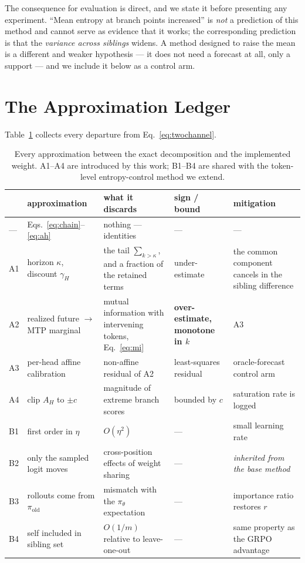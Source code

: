 \documentclass[11pt]{article}
\newcommand{\AH}{A_{H}}
\newcommand{\pit}{\pi_{\theta}}
\begin{document}
The consequence for evaluation is direct, and we state it before presenting any
experiment. ``Mean entropy at branch points increased'' is \emph{not} a prediction of
this method and cannot serve as evidence that it works; the corresponding prediction
is that the \emph{variance across siblings} widens. A method designed to raise the
mean is a different and weaker hypothesis --- it does not need a forecast at all,
only a support --- and we include it below as a control arm.

\section{The Approximation Ledger}
\label{sec:ledger}

Table~\ref{tab:ledger} collects every departure from Eq.~\eqref{eq:twochannel}.

\begin{table}[t]
\centering
\footnotesize
\setlength{\tabcolsep}{4pt}
\begin{tabular}{@{}lp{2.6cm}p{4.0cm}p{2.3cm}p{4.1cm}@{}}
\toprule
& approximation & what it discards & sign / bound & mitigation \\
\midrule
--- & Eqs.~\eqref{eq:chain}--\eqref{eq:ah} & nothing --- identities & --- & --- \\
A1 & horizon $\kappa$, discount $\gamma_H$ & the tail $\sum_{k>\kappa}$, and a fraction of the retained terms & under-estimate & the common component cancels in the sibling difference \\
A2 & realized future $\to$ MTP marginal & mutual information with intervening tokens, Eq.~\eqref{eq:mi} & \textbf{over-estimate, monotone in $k$} & A3 \\
A3 & per-head affine calibration & non-affine residual of A2 & least-squares residual & oracle-forecast control arm \\
A4 & clip $\AH$ to $\pm c$ & magnitude of extreme branch scores & bounded by $c$ & saturation rate is logged \\
B1 & first order in $\eta$ & $O(\eta^2)$ & --- & small learning rate \\
B2 & only the sampled logit moves & cross-position effects of weight sharing & --- & \emph{inherited from the base method} \\
B3 & rollouts come from $\pi_{\mathrm{old}}$ & mismatch with the $\pit$ expectation & --- & importance ratio restores $r$ \\
B4 & self included in sibling set & $O(1/m)$ relative to leave-one-out & --- & same property as the GRPO advantage \\
\bottomrule
\end{tabular}
\caption{Every approximation between the exact decomposition and the implemented
weight. A1--A4 are introduced by this work; B1--B4 are shared with the token-level
entropy-control method we extend.}
\label{tab:ledger}
\end{table}
\end{document}
